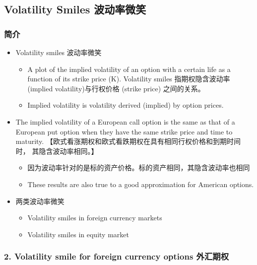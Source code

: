 \subsection{Volatility Smiles 波动率微笑}

\subsubsection{简介}

\begin{itemize}
\item Volatility smiles 波动率微笑
    
    \begin{itemize}
    \item  A plot of the implied volatility of an option with a certain life as a function of its strike price (K). Volatility smiles 指期权隐含波动率 (implied volatility)与行权价格 (strike price) 之间的关系。
    
    \item  Implied volatility is volatility derived (implied) by option prices.
    \end{itemize}
    
\item The implied volatility of a European call option is the same as that of a European put option when they have the same strike price and time to maturity. 【欧式看涨期权和欧式看跌期权在具有相同行权价格和到期时间时， 其隐含波动率相同。】
    \begin{itemize}
    \item 因为波动率针对的是标的资产价格。标的资产相同，其隐含波动率也相同
    \item These results are also true to a good approximation for American options.
    \end{itemize}
    
\item 两类波动率微笑
   
    \begin{itemize}

        \item  Volatility smiles in foreign currency markets
    
        \item  Volatility smiles in equity market
    \end{itemize}
\end{itemize}


\subsubsection{2. Volatility smile for foreign currency options 外汇期权
}


